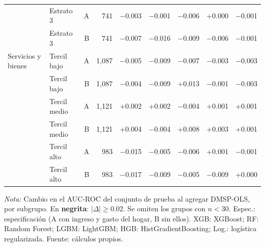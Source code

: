 \begin{table}[H]
\begin{tabular}{llrrrrrrr}
    \addlinespace
     & Estrato 3 & A & 741 & $-$0.003 & $-$0.001 & $-$0.006 & +0.000 & $-$0.001 \\
     & Estrato 3 & B & 741 & $-$0.007 & $-$0.016 & $-$0.009 & $-$0.006 & $-$0.001 \\
    \midrule
    Servicios y bienes & Tercil bajo & A & 1{,}087 & $-$0.005 & $-$0.009 & $-$0.007 & $-$0.003 & $-$0.003 \\
     & Tercil bajo & B & 1{,}087 & $-$0.004 & $-$0.009 & +0.013 & $-$0.001 & $-$0.003 \\
    \addlinespace
     & Tercil medio & A & 1{,}121 & +0.002 & +0.002 & $-$0.004 & +0.001 & +0.001 \\
     & Tercil medio & B & 1{,}121 & +0.004 & $-$0.004 & +0.008 & +0.003 & +0.001 \\
    \addlinespace
     & Tercil alto & A & 983 & $-$0.015 & $-$0.005 & $-$0.006 & +0.001 & $-$0.001 \\
     & Tercil alto & B & 983 & $-$0.017 & $-$0.009 & $-$0.005 & $-$0.009 & +0.000 \\
    \bottomrule
  \end{tabular}
  \begin{minipage}{0.95\textwidth}
    \vspace{4pt}
    \footnotesize \textit{Nota:} Cambio en el AUC-ROC del conjunto de prueba al
    agregar DMSP-OLS, por subgrupo. En \textbf{negrita}: $|\Delta|\geq 0.02$.
    Se omiten los grupos con $n<30$. Espec.: especificación (A con ingreso y
    gasto del hogar, B sin ellos). XGB: XGBoost; RF: Random Forest; LGBM:
    LightGBM; HGB: HistGradientBoosting; Log.: logística regularizada. Fuente: cálculos propios.
  \end{minipage}
\end{table}
